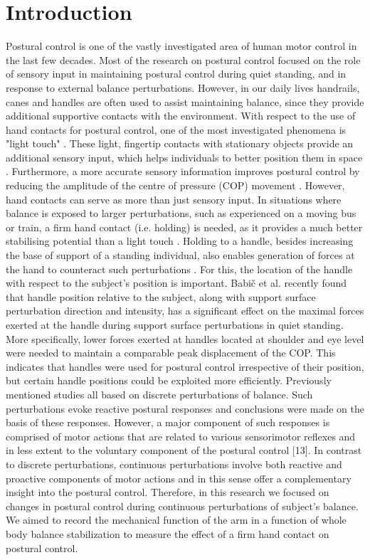 \section{Introduction}
Postural control is one of the vastly investigated area of human motor control in the last few decades. Most of the research on postural control focused on the role of sensory input in maintaining postural control during quiet standing, and in response to external balance perturbations. However, in our daily lives handrails, canes and handles are often used to assist maintaining balance, since they provide additional supportive contacts with the environment.
With respect to the use of hand contacts for postural control, one of the most investigated phenomena is "light touch" \cite{Jeka1997,Krishnamoorthy2002}. These light, fingertip contacts with stationary objects provide an additional sensory input, which helps individuals to better position them in space \cite{Jeka1997}. Furthermore, a more accurate sensory information improves postural control by reducing the amplitude of the centre of pressure (COP) movement \cite{Jeka1997,johannsen2007effects,Kouzaki2008,Wing2011a}.
However, hand contacts can serve as more than just sensory input. In situations where balance is exposed to larger perturbations, such as experienced on a moving bus or train, a firm hand contact (i.e. holding) is needed, as it provides a much better stabilising potential than a light touch \cite{Maki1997}. Holding to a handle, besides increasing the base of support of a standing individual, also enables generation of forces at the hand to counteract such perturbations \cite{Sarraf2014,Babic2014b}. For this, the location of the handle with respect to the subject’s position is important. Babič et al. \cite{Babic2014b} recently found that handle position relative to the subject, along with support surface perturbation direction and intensity, has a significant effect on the maximal forces exerted at the handle during support surface perturbations in quiet standing. More specifically, lower forces exerted at handles located at shoulder and eye level were needed to maintain a comparable peak displacement of the COP. This indicates that handles were used for postural control irrespective of their position, but certain handle positions could be exploited more efficiently.
Previously mentioned studies all based on discrete perturbations of balance. Such perturbations evoke reactive postural responses and conclusions were made on the basis of these responses. However, a major component of such responses is comprised of motor actions that are related to various sensorimotor reflexes and in less extent to the voluntary component of the postural control [13].
In contrast to discrete perturbations, continuous perturbations involve both reactive and proactive components of motor actions and in this sense offer a complementary insight into the postural control. Therefore, in this research we focused on changes in postural control during continuous perturbations of subject's balance. We aimed to record the mechanical function of the arm in a function of whole body balance stabilization to measure the effect of a firm hand contact on postural control.


